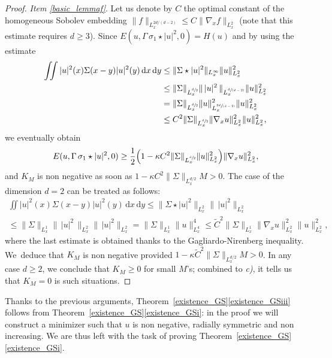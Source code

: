 \documentclass[JEP,XML,SOM,NoEqCountersInSection,NoFloatCountersInSection,Unicode,published]{cedram}
\newcommand{\spfrac}[2]{\sfrac{#1}{(#2)}}
\let\tilde\oldtilde
\theoremstyle{definition}
\let\tilde\widetilde
\let\ds\displaystyle
\newcommand{\ud}{\, {\mathrm{d}}}
\begin{document}
\begin{proof}
\textit{Item \eqref{basic_lemmaf}}. Let us denote by $C$ the optimal constant of the homogeneous Sobolev embedding $\|f\|_{L_{x}^{2d/(d-2)}}\leq C\|\nabla_{x}f\|_{L_{x}^{2}}$ (note that this estimate requires $d\geq 3$). Since $E(u,\Gamma\,\sigma_{1}\star|u|^{2},0)=H(u)$ and by using the estimate\vspace*{-3pt}
\begin{align*}
\iint|u|^{2}(x)\Sigma(x-y)|u|^{2}(y)\ud x\ud y&\leq\|\Sigma\star|u|^{2}\|_{L_{x}^{\infty}}\|u\|_{L_{x}^{2}}^{2}\\
&\leq\|\Sigma\|_{L_{x}^{\sfrac{d}{2}}}\|\,|u|^{2}\,\|_{L_{x}^{\spfrac{d}{d-2}}}\|u\|_{L_{x}^{2}}^{2}\\
&=\|\Sigma\|_{L_{x}^{\sfrac{d}{2}}}\|u\|_{L_{x}^{\spfrac{2d}{d-2}}}^{2}\|u\|_{L_{x}^{2}}^{2}\\
&\leq C^{2}\|\Sigma\|_{L_{x}^{\sfrac{d}{2}}}\|\nabla_{x}u\|_{L_{x}^{2}}^{2}\|u\|_{L_{x}^{2}}^{2},
\end{align*}
we eventually obtain\vspace*{-3pt}
\[
E(u,\Gamma\,\sigma_{1}\star|u|^{2},0)\geq\frac{1}{2}\Bigl(1-\kappa C^{2}\|\Sigma\|_{L_{x}^{\sfrac{d}{2}}}\|u\|_{L_{x}^{2}}^{2}\Bigr)\|\nabla_{x}u\|_{L_{x}^{2}}^{2},
\]
and $K_{M}$ is non negative as soon as $1-\kappa C^{2}\|\Sigma\|_{L_{x}^{d/2}}M>0$. The case of the dimension $d=2$ can be treated as follows:\vspace*{-5pt}
\begin{multline*}
\ds\iint|u|^{2}(x)\Sigma(x-y)|u|^{2}(y)\ud x\ud y\leq\|\Sigma\star|u|^{2}\|_{L_{x}^{2}}\|\,|u|^{2}\|_{L_{x}^{2}}\\
\ds\leq\|\Sigma\|_{L_{x}^{1}}\|\,|u|^{2}\,\|_{L_{x}^{2}}\|\,|u|^{2}\|_{L_{x}^{2}}=\|\Sigma\|_{L_{x}^{1}}\|u\|_{L_{x}^{4}}^{4}\leq \widetilde{C}^{2}\|\Sigma\|_{L_{x}^{1}}\|\nabla_{x}u\|_{L_{x}^{2}}^{2}\|u\|_{L_{x}^{2}}^{2},
\end{multline*}
where the last estimate is obtained thanks to the Gagliardo-Nirenberg inequality.
We~deduce that $K_{M}$ is non negative provided $1-\kappa \tilde C^{2}\|\Sigma\|_{L_{x}^{d/2}}M>0$.
In any case $d\geq 2$, we conclude that $K_M\geq 0$ for small $M$'s; combined to \textit{c)}, it tells us that $K_M=0$ is such situations.
\end{proof}

Thanks to the previous arguments, Theorem~\ref{existence_GS}\eqref{existence_GSiii} follows from Theorem~\ref{existence_GS}\eqref{existence_GSi}: in the proof we will construct a minimizer such that $u$ is non negative, radially symmetric and non increasing. We are thus left with the task of proving Theorem~\ref{existence_GS}\eqref{existence_GSi}.
\end{document}
